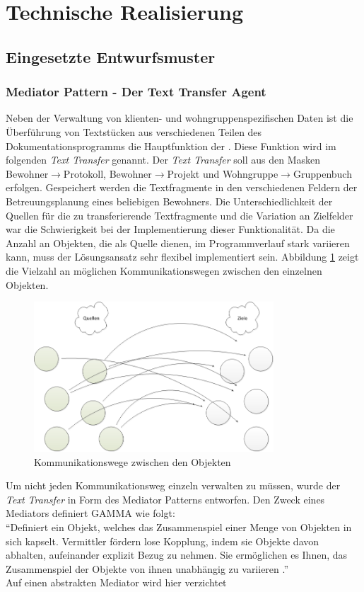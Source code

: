 \section{Technische Realisierung}

\subsection{Eingesetzte Entwurfsmuster}
\subsubsection{Mediator Pattern - Der Text Transfer Agent}
Neben der Verwaltung von klienten- und wohngruppenspezifischen Daten ist die Überführung von Textstücken aus verschiedenen Teilen des
Dokumentationsprogramms die Hauptfunktion der \EBP. Diese Funktion wird im folgenden \textit{Text Transfer} genannt. \newline
Der \textit{Text Transfer} soll aus den Masken Bewohner$\rightarrow$Protokoll, Bewohner$\rightarrow$Projekt und Wohngruppe$\rightarrow$Gruppenbuch
erfolgen. Gespeichert werden die Textfragmente in den verschiedenen Feldern der Betreuungsplanung eines beliebigen Bewohners. Die Unterschiedlichkeit
der Quellen für die zu transferierende Textfragmente und die Variation an Zielfelder war die Schwierigkeit bei der Implementierung dieser
Funktionalität. Da die Anzahl an Objekten, die als Quelle dienen, im Programmverlauf stark variieren kann, muss der Lösungsansatz sehr flexibel
implementiert sein. Abbildung \ref{unstrukturiert} zeigt die Vielzahl an möglichen Kommunikationswegen zwischen den einzelnen Objekten.\\
\begin{figure}[htp]
	\includegraphics[width=0.8\textwidth]{unmediated}
	\caption{Kommunikationswege zwischen den Objekten}
	\label{unstrukturiert}
\end{figure}
Um nicht jeden Kommunikationsweg einzeln verwalten zu müssen, wurde der \textit{Text Transfer} in Form des Mediator Patterns entworfen. Den Zweck
eines Mediators definiert GAMMA wie folgt: \\
``Definiert ein Objekt, welches das Zusammenspiel einer Menge von Objekten in sich kapselt. Vermittler fördern lose Kopplung, indem sie Objekte davon
abhalten, aufeinander explizit Bezug zu nehmen. Sie ermöglichen es Ihnen, das Zusammenspiel der Objekte von ihnen unabhängig zu
variieren \cite[S. 385]{Entwurfsmuster}.''\\
Auf einen abstrakten Mediator wird hier verzichtet 

